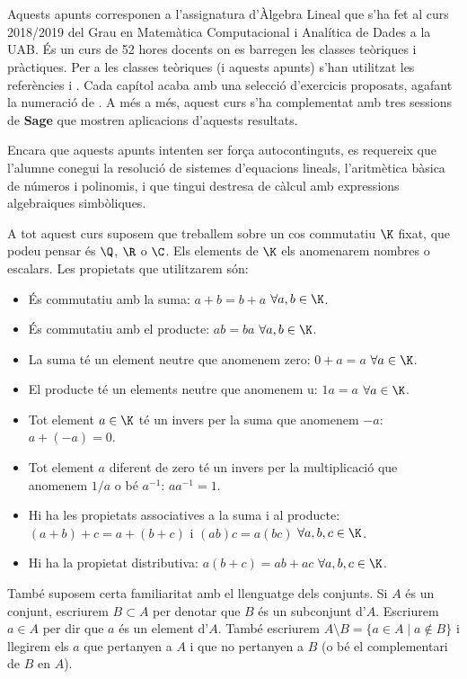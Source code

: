 \section*{}
Aquests apunts corresponen a l'assignatura d'Àlgebra Lineal que s'ha fet al curs 2018/2019 del Grau en Matemàtica Computacional i Analítica de Dades a la UAB. És un curs de 52 hores docents on es barregen les classes teòriques i pràctiques. Per a les classes teòriques (i aquests apunts) s'han utilitzat les referències \cite{Bret} i \cite{NaXa}. Cada capítol acaba amb una selecció d'exercicis proposats, agafant la numeració de \cite{Bret}. A més a més, aquest curs s'ha complementat amb tres sessions de \textbf{Sage} que mostren aplicacions d'aquests resultats.

Encara que aquests apunts intenten ser força autocontinguts, es requereix que l'alumne conegui la resolució de sistemes d'equacions lineals, l'aritmètica bàsica de números i polinomis, i que tingui destresa de càlcul amb expressions algebraiques simbòliques.

A tot aquest curs suposem que treballem sobre un cos commutatiu $\K$ fixat, que podeu pensar és $\Q$, $\R$ o $\C$. Els elements de $\K$ els anomenarem nombres o escalars. Les propietats que utilitzarem són:
\begin{itemize}
	\item És commutatiu amb la suma: $a+b=b+a$ $\forall a,b\in \K$.
	\item És commutatiu amb el producte: $ab=ba$ $\forall a,b\in \K$.
	\item La suma té un element neutre que anomenem zero: $0+a=a$ $\forall a\in\K$.
	\item El producte té un elements neutre que anomenem u: $1a=a$ $\forall a\in\K$.
	\item Tot element $a\in\K$ té un invers per la suma que anomenem $-a$: $a+(-a)=0$.
	\item Tot element $a$ diferent de zero té un invers per la multiplicació que anomenem $1/a$ o bé $a^{-1}$: $a a^{-1}=1$.
	\item Hi ha les propietats associatives a la suma i al producte: $(a+b)+c=a+(b+c)$ i $(ab)c=a(bc)$ $\forall a,b,c \in \K$.
	\item Hi ha la propietat distributiva: $a(b+c)=ab+ac$ $\forall a,b,c \in \K$.
\end{itemize}

També suposem certa familiaritat amb el llenguatge dels conjunts. Si $A$ és un conjunt, escriurem $B\subset A$ per denotar que $B$ és un subconjunt d'$A$. Escriurem $a\in A$ per dir que $a$ és un element d'$A$. També escriurem $A\setminus B=\{a \in A \mid a \not\in B\}$ i llegirem els $a$ que pertanyen a $A$ i que no pertanyen a $B$ (o bé el complementari de $B$ en $A$). 
